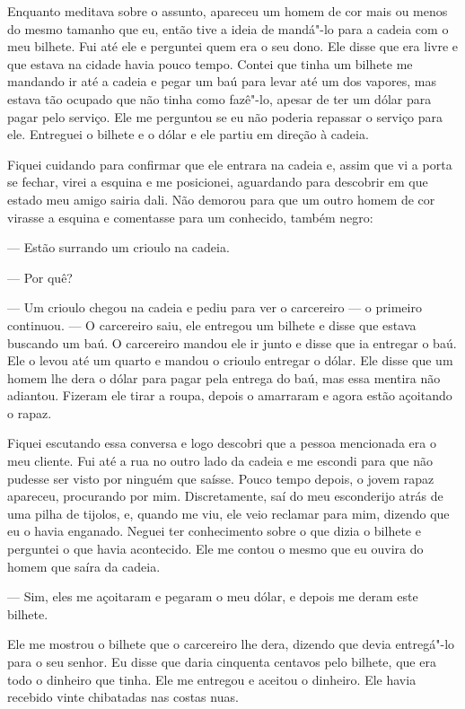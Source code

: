 Enquanto meditava sobre o assunto, apareceu um homem de cor mais ou
menos do mesmo tamanho que eu, então tive a ideia de mandá"-lo para a
cadeia com o meu bilhete. Fui até ele e perguntei quem era o seu dono.
Ele disse que era livre e que estava na cidade havia pouco tempo. Contei
que tinha um bilhete me mandando ir até a cadeia e pegar um baú para
levar até um dos vapores, mas estava tão ocupado que não tinha como
fazê"-lo, apesar de ter um dólar para pagar pelo serviço. Ele me
perguntou se eu não poderia repassar o serviço para ele. Entreguei o
bilhete e o dólar e ele partiu em direção à cadeia.

Fiquei cuidando para confirmar que ele entrara na cadeia e, assim que vi
a porta se fechar, virei a esquina e me posicionei, aguardando para
descobrir em que estado meu amigo sairia dali. Não demorou para que um
outro homem de cor virasse a esquina e comentasse para um conhecido,
também negro:

--- Estão surrando um crioulo na cadeia.

--- Por quê?

--- Um crioulo chegou na cadeia e pediu para ver o carcereiro --- o
primeiro continuou. --- O carcereiro saiu, ele entregou um bilhete e
disse que estava buscando um baú. O carcereiro mandou ele ir junto e
disse que ia entregar o baú. Ele o levou até um quarto e mandou o
crioulo entregar o dólar. Ele disse que um homem lhe dera o dólar para
pagar pela entrega do baú, mas essa mentira não adiantou. Fizeram ele
tirar a roupa, depois o amarraram e agora estão açoitando o rapaz.

Fiquei escutando essa conversa e logo descobri que a pessoa mencionada
era o meu cliente. Fui até a rua no outro lado da cadeia e me escondi
para que não pudesse ser visto por ninguém que saísse. Pouco tempo
depois, o jovem rapaz apareceu, procurando por mim. Discretamente, saí
do meu esconderijo atrás de uma pilha de tijolos, e, quando me viu, ele
veio reclamar para mim, dizendo que eu o havia enganado. Neguei ter
conhecimento sobre o que dizia o bilhete e perguntei o que havia
acontecido. Ele me contou o mesmo que eu ouvira do homem que saíra da
cadeia.

--- Sim, eles me açoitaram e pegaram o meu dólar, e depois me deram este
bilhete.

Ele me mostrou o bilhete que o carcereiro lhe dera, dizendo que devia
entregá"-lo para o seu senhor. Eu disse que daria cinquenta centavos pelo
bilhete, que era todo o dinheiro que tinha. Ele me entregou e aceitou o
dinheiro. Ele havia recebido vinte chibatadas nas costas nuas. \label{ref2}

